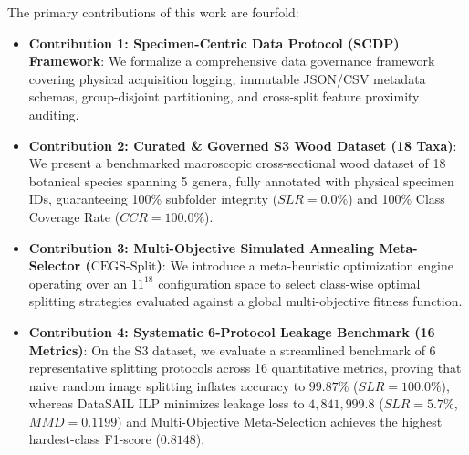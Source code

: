 The primary contributions of this work are fourfold:
\begin{itemize}
\item \textbf{Contribution 1: Specimen-Centric Data Protocol (SCDP) Framework}: We formalize a comprehensive data governance framework covering physical acquisition logging, immutable JSON/CSV metadata schemas, group-disjoint partitioning, and cross-split feature proximity auditing.
\item \textbf{Contribution 2: Curated \& Governed S3 Wood Dataset (18 Taxa)}: We present a benchmarked macroscopic cross-sectional wood dataset of 18 botanical species spanning 5 genera, fully annotated with physical specimen IDs, guaranteeing 100\% subfolder integrity ($SLR = 0.0\%$) and 100\% Class Coverage Rate ($CCR = 100.0\%$).
\item \textbf{Contribution 3: Multi-Objective Simulated Annealing Meta-Selector ($\text{CEGS-Split}$)}: We introduce a meta-heuristic optimization engine operating over an $11^{18}$ configuration space to select class-wise optimal splitting strategies evaluated against a global multi-objective fitness function.
\item \textbf{Contribution 4: Systematic 6-Protocol Leakage Benchmark (16 Metrics)}: On the S3 dataset, we evaluate a streamlined benchmark of 6 representative splitting protocols across 16 quantitative metrics, proving that naive random image splitting inflates accuracy to $99.87\%$ ($SLR = 100.0\%$), whereas DataSAIL ILP minimizes leakage loss to $4,841,999.8$ ($SLR = 5.7\%$, $MMD = 0.1199$) and Multi-Objective Meta-Selection achieves the highest hardest-class F1-score ($0.8148$).
\end{itemize}
